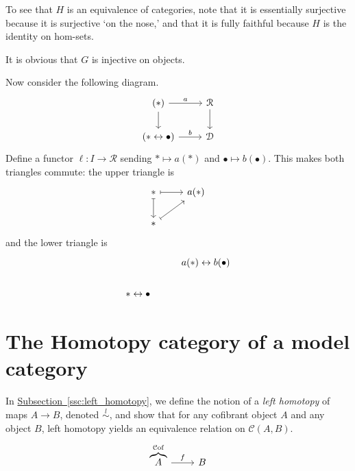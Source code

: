 \documentclass[main.tex]{subfiles}
\begin{document}
To see that $H$ is an equivalence of categories, note that it is essentially surjective because it is surjective `on the nose,' and that it is fully faithful because $H$ is the identity on hom-sets.

It is obvious that $G$ is injective on objects.

Now consider the following diagram.
\begin{equation*}
  \begin{tikzcd}
    (*)
    \arrow[r, "a"]
    \arrow[d]
    & \mathcal{R}
    \arrow[d]
    \\
    (* \leftrightarrow \bullet)
    \arrow[r, "b"]
    & \mathcal{D}
  \end{tikzcd}
\end{equation*}
Define a functor $\ell\colon I \to \mathcal{R}$ sending $* \mapsto a(*)$ and $\bullet \mapsto b(\bullet)$. This makes both triangles commute: the upper triangle is
\begin{equation*}
  \begin{tikzcd}
    *
    \arrow[r, mapsto]
    \arrow[d, mapsto]
    & a(*)
    \\
    *
    \arrow[ur, mapsto]
  \end{tikzcd}
\end{equation*}
and the lower triangle is
\begin{equation*}
  \begin{tikzcd}
    & a(*) \leftrightarrow b(\bullet)
    \\
    * \leftrightarrow \bullet
  \end{tikzcd}
\end{equation*}


\section{The Homotopy category of a model category}
\label{sec:the_homotopy_category_of_a_model_category}

In \hyperref[ssc:left_homotopy]{Subsection~\ref*{ssc:left_homotopy}}, we define the notion of a \emph{left homotopy} of maps $A \to B$, denoted $\overset{l}{\sim}$, and show that for any cofibrant object $A$ and any object $B$, left homotopy yields an equivalence relation on $\mathcal{C}(A, B)$.
\begin{equation*}
  \begin{tikzcd}
    \overbrace{A}^{\cof}
    \arrow[r, "f"]
    & B
  \end{tikzcd}
\end{equation*}
\end{document}
